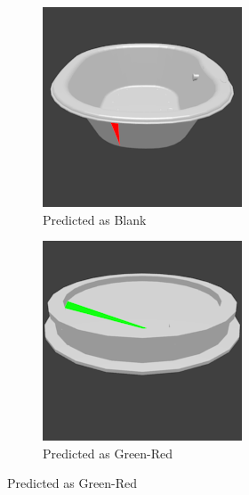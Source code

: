\begin{figure}
	\centering
	\begin{subfigure}{.3\textwidth}
		\centering
		\includegraphics[width=.8\textwidth]{images/bathtub_0117_2_006.png}
		\caption{Predicted as Blank}
		\label{fig:small-features-a}
	\end{subfigure}
	\begin{subfigure}{.3\textwidth}
		\centering
		\includegraphics[width=.8\textwidth]{images/bathtub_0127_1_007.png}
		\caption{Predicted as Green-Red}
		\label{fig:small-features-b}
	\end{subfigure}

\end{figure}
